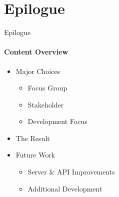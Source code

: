 \author{Marc4Prez}
\section{Epilogue}
    \begin{frame}[t]{Epilogue}\framesubtitle{Content Overview}
        \begin{itemize}
            \item Major Choices
            \begin{itemize}
                    \item Focus Group
                    \item Stakeholder 
                    \item Development Focus
            \end{itemize}
            \item The Result
            \item Future Work
            \begin{itemize}
                \item Server \& API Improvements
                \item Additional Development
            \end{itemize}
        \end{itemize}
    \end{frame}

